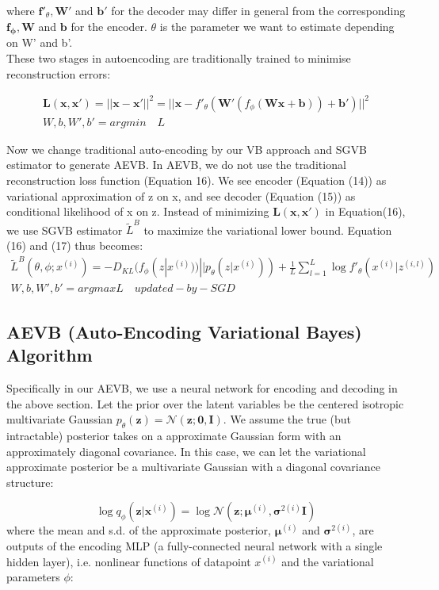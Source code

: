 \documentclass[11pt]{article}
\begin{document}
where $\mathbf f'_{\theta} ,\mathbf {W'}$ and $\mathbf {b'}$ for the decoder may differ in general from the corresponding $\mathbf {f_{\phi}} ,\mathbf {W}$ and $\mathbf {b}$ for the encoder. $\theta$ is the parameter we want to estimate depending on W' and b'.\\ 

\vspace{3mm}
These two stages in autoencoding are traditionally trained to minimise reconstruction errors:

\begin{eqnarray}
\mathbf{L(x, x')} = ||\mathbf{x}-\mathbf{x'}||^2 = ||\mathbf{x}-f'_{\theta}(\mathbf{W'}(f_{\phi}(\mathbf{Wx+b}))+\mathbf{b'})||^2 \\
W,b,W',b' = argmin \quad L 
\end{eqnarray}


\noindent
Now we change traditional auto-encoding by our VB approach and SGVB estimator to generate AEVB. In AEVB, we do not use the traditional reconstruction loss function (Equation 16). We see encoder (Equation (14)) as variational approximation of z on x, and see decoder (Equation (15)) as conditional likelihood of x on z. Instead of minimizing $\mathbf{L(x, x')}$ in Equation(16), we use SGVB estimator $\widetilde{L}^B$ to maximize the variational lower bound. Equation (16) and (17) thus becomes: 
\begin{eqnarray}
\widetilde{L}^B(\theta, \phi; x^{(i)})=-D_{KL}(f_\phi(z|x^{(i)}))||p_\theta(z|x^{(i)}))+\frac{1}{L}\sum^L_{l=1}\log f'_\theta (x^{(i)}|z^{(i, l)})\\
W,b,W',b' = argmax L  \quad updated-by-SGD
\end{eqnarray}


\subsection{AEVB (Auto-Encoding Variational Bayes) Algorithm}

Specifically in our AEVB,  we use a neural network for encoding and decoding in the above section. Let the prior over the latent variables be the centered isotropic multivariate Gaussian $p_\theta(\mathbf{z})=\mathcal{N}(\mathbf{z};\mathbf{0}, \mathbf{I})$. We assume the true (but intractable) posterior takes on a approximate Gaussian form with an approximately diagonal covariance. In this case, we can let the variational approximate posterior be a multivariate Gaussian with a diagonal covariance structure:

\begin{equation}
\log q_\phi(\mathbf{z}|\mathbf{x}^{(i)})=\log\mathcal{N}(\mathbf{z};\mathbf{\mu}^{(i)}, \mathbf{\sigma}^{2(i)}\mathbf{I})
\end{equation}
\noindent
where the mean and s.d. of the approximate posterior, $\mathbf{\mu}^{(i)}$ and $\mathbf{\sigma}^{2(i)}$, are outputs of the encoding MLP (a fully-connected neural network with a single hidden layer), i.e. nonlinear functions of datapoint $x^{(i)}$ and the variational parameters $\phi$:
\end{document}
